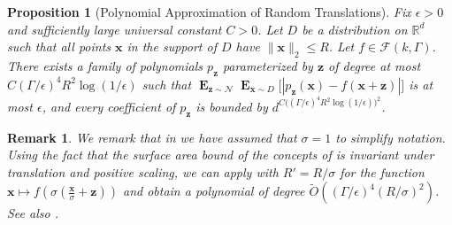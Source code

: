 \documentclass[10pt,a4paper]{article}
\newtheorem{proposition}{Proposition}[section]
\newtheorem{remark}{Remark}[section]
\newcommand\twonorm[1]{\|#1\|_2}
\renewcommand\vec[1]{\mathbf{#1}}
\DeclareMathOperator*{\E}{\mathbf{E}}
\newcommand{\R}{\mathbb{R}}
\newcommand{\eps}{\epsilon}
\newcommand{\1}{\Ind}
\newcommand{\wt}{\widetilde}
\newcommand{\x}{\vec x}
\newcommand{\z}{\vec z}
\newcommand{\Gauss}{\mathcal{N}}
\begin{document}
\begin{proposition}[Polynomial Approximation of Random Translations]
    \label{lem: boolean_bounded_approx} 
   Fix $\eps > 0$ and  sufficiently large universal constant $C > 0$. 
    Let $D$ be a distribution on $\R^d$ such that all points $\x$ in the support of $D$ have $\twonorm{\x}\leq R$. Let $f \in \mathcal F(k, \Gamma)$.
    There exists a family of polynomials $p_{\z}$ parameterized by $\z$ of degree at most $C(\Gamma/\epsilon)^4 R^2\log(1/\epsilon)$ such that
     $\E_{\z\sim \Gauss}\E_{\x \sim D}\bigl[|p_{\z}(\x)-f(\x+\z)|\bigr]$ is at most $\epsilon$, and every coefficient of $p_{\z}$ is bounded by $d^{C\bigl((\Gamma/\epsilon)^4 R^2\log(1/\epsilon)\bigr)^2}$. 
    \end{proposition}
\begin{remark}
\label{rem:scaling-invariance}
We remark that in  we have assumed that $\sigma = 1$ to simplify notation.  Using the fact that the surface area bound of the concepts of  is invariant under translation and positive scaling, we can apply 
with $R' = R/\sigma$ for the function $\x \mapsto f(\sigma (\frac{\x}{\sigma} + \vec z))$ and obtain a polynomial of degree $\wt{O}( (\Gamma/\eps)^4 (R/\sigma)^2)$.  See also .
\end{remark}
\end{document}
